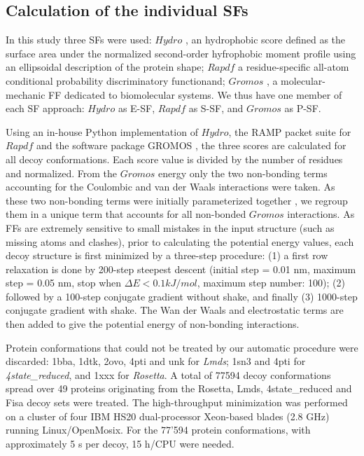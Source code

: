 \documentclass[a4paper,20pt,notitlepage,openbib]{article}
\begin{document}
\subsection{Calculation of the individual SFs }
In this study three SFs were used: $Hydro$ \cite{silverman:hydro02, silverman:hydro01}, an hydrophobic score defined as the surface area under the normalized second-order hyfrophobic moment profile using an ellipsoidal description of the protein shape; $Rapdf$ \cite{moult:pmf01} a residue-specific all-atom conditional probability discriminatory functionand; $Gromos$ \cite{vanGunsteren:gromos01}, a molecular-mechanic FF dedicated to biomolecular systems. We thus have one member of each SF approach: $Hydro$ as E-SF, $Rapdf$ as S-SF, and $Gromos$ as P-SF.

Using an in-house Python implementation of $Hydro$, the RAMP packet suite \cite{url:ramp} for $Rapdf$ and the software package GROMOS \cite{url:gromos}, the three scores are calculated for all decoy conformations. Each score value is divided by the number of residues and normalized. From the $Gromos$ energy only the two non-bonding terms accounting for the Coulombic and van der Waals interactions were taken. As these two non-bonding terms were initially parameterized together \cite{vanGunsteren:gromos01}, we regroup them in a unique term that accounts for all non-bonded $Gromos$ interactions. As FFs are extremely sensitive to small mistakes in the input structure (such as missing atoms and clashes), prior to calculating the potential energy values, each decoy structure is first minimized by a three-step procedure: (1) a first row relaxation is done by 200-step steepest descent (initial step = 0.01 nm, maximum step = 0.05 nm,  stop when $\Delta E < 0.1 kJ/mol$, maximum step number: 100); (2) followed by a 100-step conjugate gradient without shake, and finally (3) 1000-step conjugate gradient with shake. The Wan der Waals and electrostatic terms are then added to give the potential energy of non-bonding interactions.

Protein conformations that could not be treated by our automatic procedure were discarded: 1bba, 1dtk, 2ovo, 4pti and unk for \emph{Lmds}; 1sn3 and 4pti for \emph{4state\_reduced}, and 1xxx for \emph{Rosetta}. A total of 77594 decoy conformations spread over 49 proteins originating from the Rosetta, Lmds, 4state\_reduced and Fisa decoy sets were treated. The high-throughput minimization was performed on a cluster of four IBM HS20 dual-processor Xeon-based blades (2.8 GHz) running Linux/OpenMosix. For the 77'594 protein conformations, with approximately 5 s per decoy, 15 h/CPU were needed.
\end{document}
